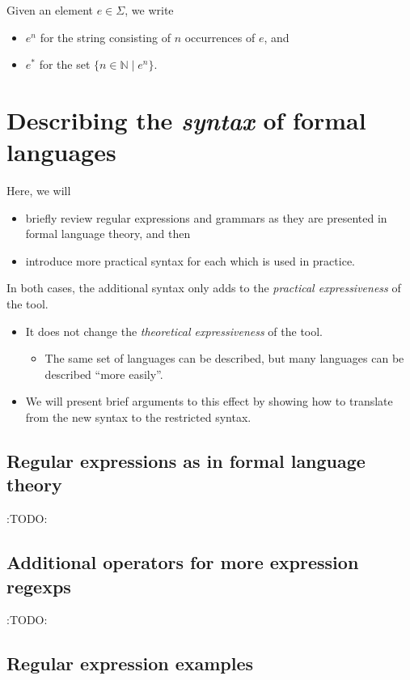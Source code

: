 \documentclass[11pt]{article}
\theoremstyle{definition}
\begin{document}
Given an element \(e ∈ Σ\), we write
\begin{itemize}
\item \(e^{n}\) for the string consisting of \(n\) occurrences of \(e\), and
\item \(e^{*}\) for the set \(\{ n ∈ ℕ ∣ e^{n} \}\).
\end{itemize}

\section{Describing the \emph{syntax} of formal languages}
\label{sec:orgef460eb}

Here, we will
\begin{itemize}
\item briefly review regular expressions and grammars as
they are presented in formal language theory, and then
\item introduce more practical syntax for each
which is used in practice.
\end{itemize}

In both cases, the additional syntax only adds to
the \emph{practical expressiveness} of the tool.
\begin{itemize}
\item It does not change the \emph{theoretical expressiveness} of the tool.
\begin{itemize}
\item The same set of languages can be described,
but many languages can be described “more easily”.
\end{itemize}
\item We will present brief arguments to this effect
by showing how to translate from the new syntax
to the restricted syntax.
\end{itemize}

\subsection{Regular expressions as in formal language theory}
\label{sec:org5b47a3f}

:TODO:

\subsection{Additional operators for more expression regexps}
\label{sec:orgb4f3fe4}

:TODO:

\subsection{Regular expression examples}
\label{sec:orgab72c2b}
\end{document}
